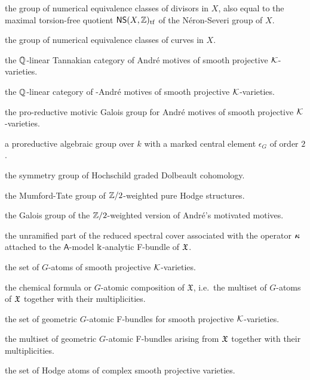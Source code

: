 \documentclass[twoside,leqno]{article}
\numberwithin{equation}{section}
\theoremstyle{plain}
\theoremstyle{definition}
\begin{document}
\begin{description}[style=multiline, leftmargin=7.5em, labelwidth=7em, align=left, itemsep=0pt]
\item[$\mathsf{N}^{1}(X,\bbZ)$] the group of numerical equivalence classes of divisors in $X$, also equal to 
 the maximal torsion-free quotient $\mathsf{NS}(X,\mathbb Z)_{\operatorname{tf}}$ of the N\'{e}ron-Severi group of $X$. 
\item[$\mathsf{N}_{1}(X,\bbZ)$] the group of numerical equivalence classes of curves in $X$.
\item[$\CA{\kay}$] the $\mathbb Q$-linear Tannakian category of Andr\'{e} motives of smooth projective $\mathcal K$-varieties.
\item[$\CA{\kay}/\mathsf{Tate}$] the $\mathbb Q$-linear category of \nc-Andr\'{e} motives of smooth projective $\mathcal K$-varieties.
\item[$\GA{\kay}$] the pro-reductive motivic Galois group for Andr\'{e} motives of smooth projective $\mathcal K$-varieties.
\item[$(G,\epsilon_{G})$] a proreductive algebraic group over $k$ with a marked central element $\epsilon_{G}$ of order $2$.
\item[$(\HHgr,\epsilon_{\HHgr})$]  the symmetry group of Hochschild graded Dolbeault cohomology.
\item[$(\hodge,\epsilon_{\hodge})$]  the Mumford-Tate group of $\mathbb Z/2$-weighted pure Hodge structures. 
\item[$(\motM,\epsilon_{\motM})$] the Galois group of the $\mathbb Z/2$-weighted version of Andr\'{e}'s motivated motives.
\item[$\tU_{\fX}$] the unramified part of the reduced spectral cover associated with the operator $\boldsymbol{\kappa}$ attached to the $\mathsf{A}$-model $\Bbbk$-analytic F-bundle of $\mathfrak X$.
\item[$\Atoms_{G}^{\kay}$]  the set of $G$-atoms of smooth projective $\mathcal K$-varieties.
\item[$\CF_{G}(\mathfrak{X})$] the chemical formula or $G$-atomic composition of $\mathfrak{X}$, i.e.\ the multiset of $G$-atoms of $\mathfrak X$ together with their multiplicities.
\item[$\Atoms_{G}^{\kay,\mathsf{F}}$] the set of geometric $G$-atomic F-bundles for smooth projective $\mathcal K$-varieties.
\item[$\CF_{G}^{\mathsf{F}}(\mathfrak{X})$]  the multiset of geometric $G$-atomic F-bundles arising from $\mathfrak X$ together with their multiplicities.
\item[$\HAtoms$] the set of Hodge atoms of complex smooth projective varieties.
\end{description}
\end{document}
